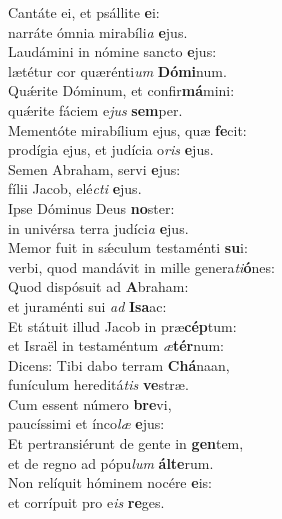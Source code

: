 \evenverse Cantáte ei, et psállite \textbf{e}i:~\*\\
\evenverse narráte ómnia mirabíli\textit{a} \textbf{e}jus.\\
\oddverse Laudámini in nómine sancto \textbf{e}jus:~\*\\
\oddverse lætétur cor quærénti\textit{um} \textbf{Dó}\textbf{mi}num.\\
\evenverse Quǽrite Dóminum, et confir\textbf{má}mini:~\*\\
\evenverse quǽrite fáciem e\textit{jus} \textbf{sem}per.\\
\oddverse Mementóte mirabílium ejus, quæ \textbf{fe}cit:~\*\\
\oddverse prodígia ejus, et judícia o\textit{ris} \textbf{e}jus.\\
\evenverse Semen Abraham, servi \textbf{e}jus:~\*\\
\evenverse fílii Jacob, elé\textit{cti} \textbf{e}jus.\\
\oddverse Ipse Dóminus Deus \textbf{no}ster:~\*\\
\oddverse in univérsa terra judíci\textit{a} \textbf{e}jus.\\
\evenverse Memor fuit in sǽculum testaménti \textbf{su}i:~\*\\
\evenverse verbi, quod mandávit in mille genera\textit{ti}\textbf{ó}nes:\\
\oddverse Quod dispósuit ad \textbf{A}braham:~\*\\
\oddverse et juraménti sui \textit{ad} \textbf{I}\textbf{sa}ac:\\
\evenverse Et státuit illud Jacob in præ\textbf{cép}tum:~\*\\
\evenverse et Israël in testaméntum \textit{æ}\textbf{tér}num:\\
\oddverse Dicens: Tibi dabo terram \textbf{Chá}naan,~\*\\
\oddverse funículum hereditá\textit{tis} \textbf{ve}stræ.\\
\evenverse Cum essent número \textbf{bre}vi,~\*\\
\evenverse paucíssimi et ínco\textit{læ} \textbf{e}jus:\\
\oddverse Et pertransiérunt de gente in \textbf{gen}tem,~\*\\
\oddverse et de regno ad pópu\textit{lum} \textbf{ál}\textbf{te}rum.\\
\evenverse Non relíquit hóminem nocére \textbf{e}is:~\*\\
\evenverse et corrípuit pro e\textit{is} \textbf{re}ges.\\
